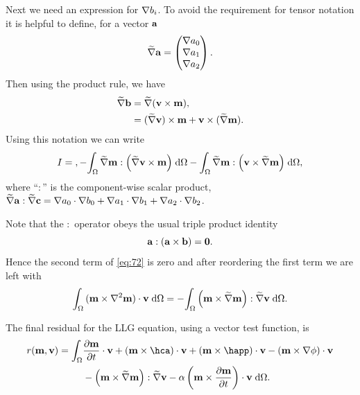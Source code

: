 {Next we need an expression for $\nabla b_i$.
To avoid the requirement for tensor notation it is helpful to define, for a vector ${\boldsymbol{\mathrm{a}}}$
\begin{equation}
\widetilde{\nabla} {\boldsymbol{\mathrm{a}}} = \begin{pmatrix} \nabla a_0 \\ \nabla a_1 \\ \nabla a_2 \end{pmatrix}.
\end{equation}
Then using the product rule, we have
\begin{equation}
  \begin{aligned}
    \widetilde{\nabla} {\boldsymbol{\mathrm{b}}} &= \widetilde{\nabla} {\left( \boldsymbol{\mathrm{v}} \times \boldsymbol{\mathrm{m}} \right)}, \\
    & = (\widetilde{\nabla} \boldsymbol{\mathrm{v}}) \times \boldsymbol{\mathrm{m}} + \boldsymbol{\mathrm{v}} \times (\widetilde{\nabla} \boldsymbol{\mathrm{m}}).
  \end{aligned}
\end{equation}
Using this notation we can write
\begin{equation}
  I =  \\,
  - \intd{\gradv \mv : \bigb{\gradv \testv \times \mv}}
      - \intd{\gradv \mv : \bigb{\testv \times \gradv \mv}},
      \label{eq:72}
\end{equation}
where ``$:$'' is the component-wise scalar product, \ie $\widetilde{\nabla} {\boldsymbol{\mathrm{a}}} : \widetilde{\nabla} {\boldsymbol{\mathrm{c}}} = \nabla a_0 \cdot \nabla b_0 + \nabla a_1 \cdot \nabla b_1 + \nabla a_2 \cdot \nabla b_2$.

Note that the $:$ operator obeys the usual triple product identity
\begin{equation}
  \av : (\av \times \bv) = \zerov.
  \label{triple:-identity}
\end{equation}
Hence the second term of \cref{eq:72} is zero and after reordering the first term we are left with
\begin{equation}
  \label{eq:final-lap-residual}
  \intd{ (\mv \times \lap \mv) \cdot \testv } = - \intd{\bigb{\mv \times \gradv \mv} : \gradv \testv}.
\end{equation}

The final residual for the LLG equation, using a vector test function, is
\begin{equation}
  \begin{aligned}
    \label{eq:llg-res-final}
    \rllg(\mv, \testv) = \int_\magd &\dmdt\cdot \testv
    + (\mv \times \hca)\cdot \testv
    + (\mv \times \happ)\cdot \testv
    - (\mv \times \grad \phi)\cdot \testv \\
    & - \bigb{\mv \times \gradv \mv} : \gradv \testv
    - \dampc \left( \mv \times \dmdt \right)\cdot \testv
    \d\magd.
  \end{aligned}
\end{equation}

}
